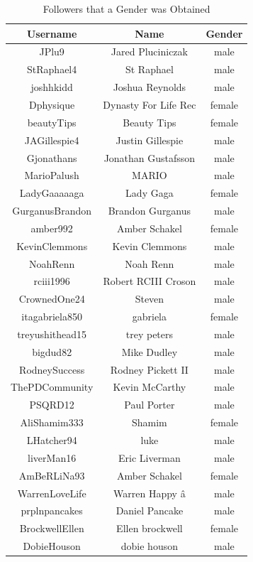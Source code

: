 \documentclass[12pt,letterpaper]{article}
\begin{document}
\newpage 
\begin{table}[ht!]
    \centering
    \begin{tabular}{|c|c|c|}\hline
    \textbf{Username} & \textbf{Name} & \textbf{Gender} \\\hline
    JPlu9 & Jared Pluciniczak & male \\ \hline 
    StRaphael4 & St Raphael & male \\ \hline 
    joshhkidd & Joshua Reynolds  & male \\ \hline 
    Dphysique & Dynasty For Life Rec & female \\ \hline 
    beautyTips & Beauty Tips  & female \\ \hline 
    JAGillespie4 & Justin Gillespie & male \\ \hline 
    Gjonathans & Jonathan Gustafsson & male \\ \hline 
    MarioPalush & MARIO & male \\ \hline 
    LadyGaaaaaga & Lady Gaga & female \\ \hline 
    GurganusBrandon & Brandon Gurganus & male \\ \hline 
    amber992 & Amber Schakel & female \\ \hline 
    KevinClemmons & Kevin Clemmons & male \\ \hline 
    NoahRenn & Noah Renn & male \\\hline 
    rciii1996 & Robert RCIII Croson & male \\\hline 
    CrownedOne24 & Steven & male \\\hline 
    itagabriela850 & gabriela & female \\\hline 
    treyushithead15 & trey peters & male \\\hline 
    bigdud82 & Mike Dudley & male \\\hline 
    RodneySuccess & Rodney Pickett II & male \\\hline 
    ThePDCommunity & Kevin McCarthy & male \\\hline 
    PSQRD12 & Paul Porter & male \\\hline 
    AliShamim333 & Shamim & female \\\hline 
    LHatcher94 & luke & male \\\hline 
    liverMan16 & Eric Liverman & male \\\hline 
    AmBeRLiNa93 & Amber Schakel & female \\\hline 
    WarrenLoveLife & Warren Happy â & male \\\hline 
    prplnpancakes & Daniel Pancake & male \\\hline 
    BrockwellEllen & Ellen brockwell & female \\\hline 
    DobieHouson & dobie houson & male \\\hline 
    \end{tabular}
    \caption{Followers that a Gender was Obtained}
    \label{tab:my_label}
\end{table}
\end{document}
